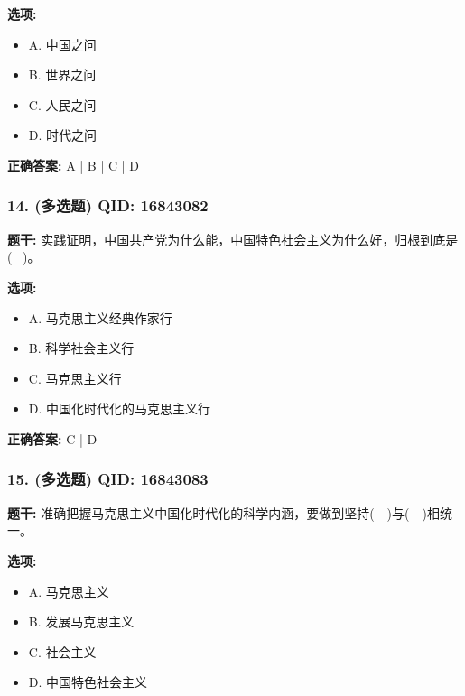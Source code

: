 \documentclass[12pt,UTF8]{ctexart}
\begin{document}
\textbf{选项:}
\begin{itemize}[leftmargin=*]

  \item A. 中国之问

  \item B. 世界之问

  \item C. 人民之问

  \item D. 时代之问

\end{itemize}

\textbf{正确答案:}
A | B | C | D

\vspace{0.3em}\hrulefill\vspace{0.7em}

\subsubsection*{14. (多选题) \small QID: 16843082}

\textbf{题干:}
实践证明，中国共产党为什么能，中国特色社会主义为什么好，归根到底是(  )。

\textbf{选项:}
\begin{itemize}[leftmargin=*]

  \item A. 马克思主义经典作家行

  \item B. 科学社会主义行

  \item C. 马克思主义行

  \item D. 中国化时代化的马克思主义行

\end{itemize}

\textbf{正确答案:}
C | D

\vspace{0.3em}\hrulefill\vspace{0.7em}

\subsubsection*{15. (多选题) \small QID: 16843083}

\textbf{题干:}
准确把握马克思主义中国化时代化的科学内涵，要做到坚持(  )与(  )相统一。

\textbf{选项:}
\begin{itemize}[leftmargin=*]

  \item A. 马克思主义

  \item B. 发展马克思主义

  \item C. 社会主义

  \item D. 中国特色社会主义

\end{itemize}
\end{document}
